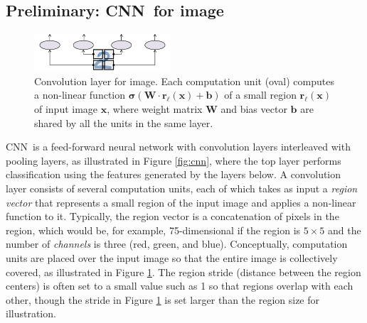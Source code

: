 \documentclass[11pt,letterpaper]{article}
\newcommand{\cnn}{CNN}
\newcommand{\bx}{{\mathbf x}}
\newcommand{\Activ}{\boldsymbol{\sigma}}
\newcommand{\Wei}{{\mathbf W}}
\newcommand{\Bias}{{\mathbf b}}
\newcommand{\region}{{\mathbf r}} %
\newcommand{\iL}{\ell} %
\begin{document}
\subsection{Preliminary: \cnn\ for image}
\label{sec:cnn-image}

\begin{figure}
\centering
\includegraphics[width=2in]{imgconv}
\vspace{-0.1in}
\caption{\label{fig:imgconv} \footnotesize %
Convolution layer for image.  
Each computation unit (oval) computes a non-linear function 
$\Activ( \Wei \cdot \region_\iL(\bx) + \Bias )$ of a small region $\region_\iL(\bx)$ of input image $\bx$, 
where weight matrix $\Wei$ and bias vector $\Bias$ are shared by all the units in the same layer.
}
\end{figure}

\cnn\ is a feed-forward neural network with convolution layers interleaved with  
pooling layers, as illustrated in Figure \ref{fig:cnn}, where 
the top layer performs classification using the features generated by the 
layers below. %
A convolution layer consists of several computation units, each of which 
takes as input a {\em region vector} that represents a small region of the input image 
and applies a non-linear function to it.  
Typically, the region vector is a concatenation of pixels in the region, which 
would be, for example, 75-dimensional if the region is $5 \times 5$ and the number of {\em channels} 
is three (red, green, and blue).  
Conceptually, computation units are placed over the input image so that the entire image is 
collectively covered, as illustrated in Figure \ref{fig:imgconv}.  
The region stride (distance between the region centers) is often set to a small value such as 1 
so that regions overlap with each other, 
though the stride in Figure \ref{fig:imgconv} is set larger than the region size for illustration.  
\end{document}
